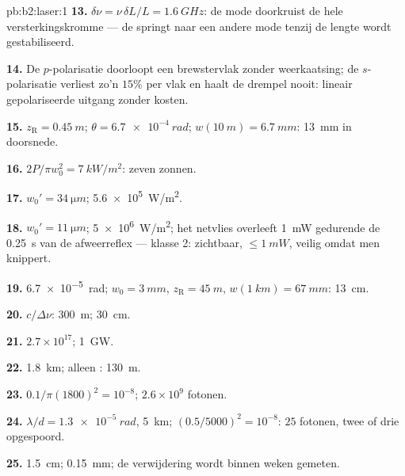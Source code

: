 \begin{solution}{pb:b2:laser:1}
\textbf{13.} $\delta\nu = \nu\,\delta L/L = \qty{1.6}{GHz}$: de mode doorkruist de
hele versterkingskromme --- de  springt naar een andere mode tenzij de lengte
wordt gestabiliseerd.

\textbf{14.} De $p$-polarisatie doorloopt een brewstervlak zonder
weerkaatsing; de $s$-polarisatie verliest zo'n $15\%$ per vlak en
haalt de drempel nooit: lineair gepolariseerde uitgang zonder kosten.

\textbf{15.} $z_{\text{R}} = \qty{0.45}{m}$; $\theta = \qty{6.7e-4}{rad}$;
$w(\qty{10}{m})
= \qty{6.7}{mm}$: \qty{13}{mm} in doorsnede.

\textbf{16.} $2P/\pi w_0^2 = \qty{7}{kW/m^2}$: zeven zonnen.

\textbf{17.} $w_0' = \qty{34}{\micro m}$; \qty{5.6e5}{W/m^2}.

\textbf{18.} $w_0' = \qty{11}{\micro m}$; \qty{5e6}{W/m^2}; het netvlies overleeft
\qty{1}{mW} gedurende de \qty{0.25}{s} van de afweerreflex --- klasse 2: zichtbaar,
$\le \qty{1}{mW}$, veilig omdat men knippert.

\textbf{19.} \qty{6.7e-5}{rad}; $w_0 = \qty{3}{mm}$, $z_{\text{R}} = \qty{45}{m}$,
$w(\qty{1}{km}) = \qty{67}{mm}$: \qty{13}{cm}.

\textbf{20.} $c/\Delta\nu$: \qty{300}{m}; \qty{30}{cm}.

\textbf{21.} $2.7 \times 10^{17}$; \qty{1}{GW}.

\textbf{22.} \qty{1.8}{km}; alleen : \qty{130}{m}.

\textbf{23.} $0.1/\pi(1800)^2 = 10^{-8}$; $2.6 \times 10^9$ fotonen.

\textbf{24.} $\lambda/d = \qty{1.3e-5}{rad}$, \qty{5}{km}; $(0.5/5000)^2 = 10^{-8}$:
$25$ fotonen, twee of drie opgespoord.

\textbf{25.} \qty{1.5}{cm}; \qty{0.15}{mm}; de verwijdering wordt binnen
weken gemeten.
\end{solution}
